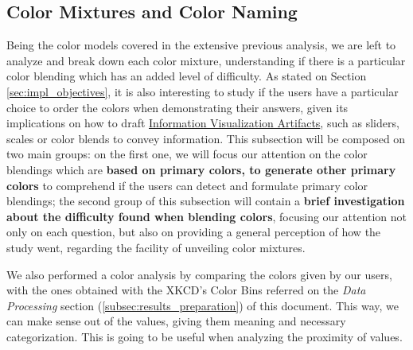 \subsection{Color Mixtures and Color Naming}
\label{subsec:results_colormixtures}
%
Being the color models covered in the extensive previous analysis, we are left to analyze and break down each color mixture, understanding if there is a particular color blending which has an added level of
difficulty. As stated on Section \ref{sec:impl_objectives}, it is also interesting to study if the users have a particular choice to order the colors when demonstrating their answers, given its implications on how to draft \ul{Information Visualization Artifacts},
such as sliders, scales or color blends to convey information.
%
This subsection will be composed on two main groups: on the first one, we will focus our attention on the color blendings which are \textbf{based on primary colors, to generate other primary colors} to comprehend
if the users can detect and formulate primary color blendings; the second group of this subsection will contain a \textbf{brief investigation about the difficulty found when blending colors}, focusing our attention
not only on each question, but also on providing a general perception of how the study went, regarding the facility of unveiling color mixtures. \par
%
We also performed a color analysis by comparing the colors given by our users, with the ones obtained with the XKCD's Color Bins referred on the \emph{Data Processing} section (\ref{subsec:results_preparation}) of this document. This way,
we can make sense out of the values, giving them meaning and necessary categorization. This is going to be useful when analyzing the proximity of values.
%
